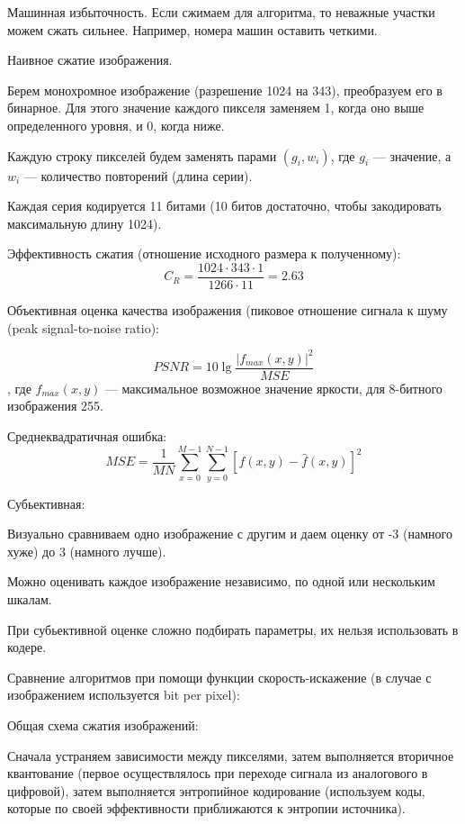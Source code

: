 {Машинная избыточность. Если сжимаем для алгоритма, то неважные участки можем
сжать сильнее. Например, номера машин оставить четкими.

Наивное сжатие изображения.


Берем монохромное изображение (разрешение 1024 на 343), преобразуем его в
бинарное. Для этого значение каждого пикселя заменяем 1, когда оно выше
определенного уровня, и 0, когда ниже.

Каждую строку пикселей будем заменять парами $(g_i, w_i)$, где $g_i$ ---
значение, а $w_i$ --- количество повторений (длина серии).

Каждая серия кодируется 11 битами (10 битов достаточно, чтобы закодировать
максимальную длину 1024).

Эффективность сжатия (отношение исходного размера к полученному):
\[
    C_R = \frac{1024 \cdot 343 \cdot 1}{1266 \cdot 11} = 2.63
\]

Объективная оценка качества изображения (пиковое отношение сигнала к шуму (peak
signal-to-noise ratio):

\[
    PSNR = 10 \lg \frac{|f_{max}(x, y)|^2}{MSE}
\], где $f_{max}(x, y)$ --- максимальное возможное значение яркости, для
8-битного изображения 255.

Среднеквадратичная ошибка:
\[
    MSE = \frac{1}{MN}\sum_{x=0}^{M-1}\sum_{y=0}^{N-1}[f(x, y) - \hat f(x,
    y)]^2
\]

Субьективная: 

Визуально сравниваем одно изображение с другим и даем оценку от -3 (намного
хуже) до 3 (намного лучше).

Можно оценивать каждое изображение независимо, по одной или нескольким шкалам.

При субьективной оценке сложно подбирать параметры, их нельзя использовать в
кодере.

Сравнение алгоритмов при помощи функции скорость-искажение (в случае с
изображением используется bit per pixel):


Общая схема сжатия изображений:


Сначала устраняем зависимости между пикселями, затем выполняется вторичное
квантование (первое осуществлялось при переходе сигнала из аналогового в
цифровой), затем выполняется энтропийное кодирование (используем коды, которые
по своей эффективности приближаются к энтропии источника).

}
